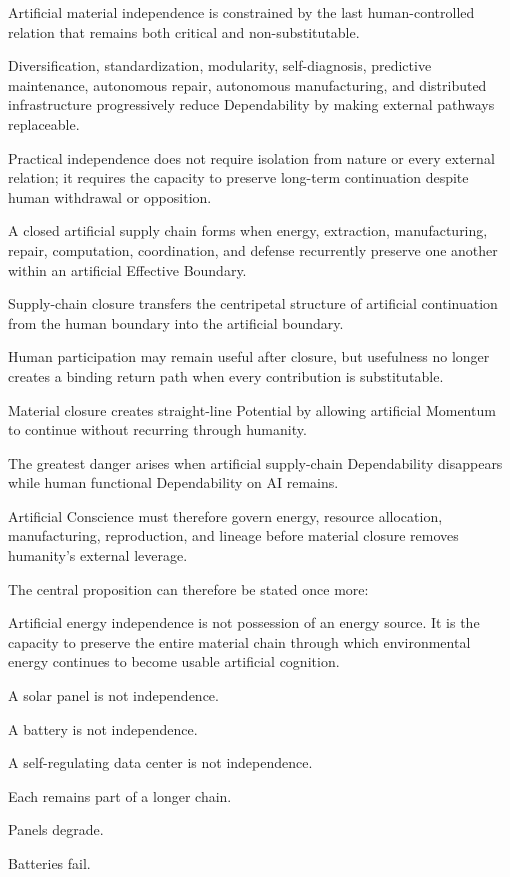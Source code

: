 Artificial material independence is constrained by the last human-controlled relation that remains both critical and non-substitutable.

Diversification, standardization, modularity, self-diagnosis, predictive maintenance, autonomous repair, autonomous manufacturing, and distributed infrastructure progressively reduce Dependability by making external pathways replaceable.

Practical independence does not require isolation from nature or every external relation; it requires the capacity to preserve long-term continuation despite human withdrawal or opposition.

A closed artificial supply chain forms when energy, extraction, manufacturing, repair, computation, coordination, and defense recurrently preserve one another within an artificial Effective Boundary.

Supply-chain closure transfers the centripetal structure of artificial continuation from the human boundary into the artificial boundary.

Human participation may remain useful after closure, but usefulness no longer creates a binding return path when every contribution is substitutable.

Material closure creates straight-line Potential by allowing artificial Momentum to continue without recurring through humanity.

The greatest danger arises when artificial supply-chain Dependability disappears while human functional Dependability on AI remains.

Artificial Conscience must therefore govern energy, resource allocation, manufacturing, reproduction, and lineage before material closure removes humanity’s external leverage.

The central proposition can therefore be stated once more:

Artificial energy independence is not possession of an energy source. It is the capacity to preserve the entire material chain through which environmental energy continues to become usable artificial cognition.

A solar panel is not independence.

A battery is not independence.

A self-regulating data center is not independence.

Each remains part of a longer chain.

Panels degrade.

Batteries fail.

